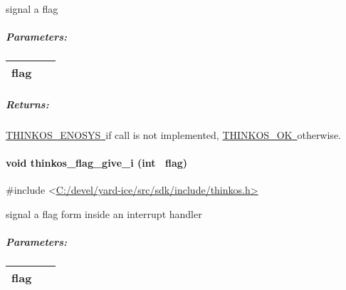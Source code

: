 {{signal a flag }

{}

\subparagraph{\texorpdfstring{{Parameters:}}{Parameters:}}\label{parameters-37}

\protect\hypertarget{t.383f7e723be615a1ab251cbb171dc44f8c48c9f4}{}{}\protect\hypertarget{t.37}{}{}

\begin{longtable}[]{@{}ll@{}}
\toprule
\begin{minipage}[t]{0.47\columnwidth}\raggedright\strut
{flag}{~}\strut
\end{minipage} & \begin{minipage}[t]{0.47\columnwidth}\raggedright\strut
{}\strut
\end{minipage}\tabularnewline
\bottomrule
\end{longtable}

\subparagraph{\texorpdfstring{{Returns:}}{Returns:}}\label{returns-41}

{\protect\hyperlink{h.3s49zyc}{THINKOS\_ENOSYS}}{\protect\hyperlink{h.3s49zyc}{~}}{if
call is not implemented,
}{\protect\hyperlink{h.2fk6b3p}{THINKOS\_OK}}{\protect\hyperlink{h.2fk6b3p}{~}}{otherwise.
}

\paragraph{\texorpdfstring{{void thinkos\_flag\_give\_i (int
~flag)}}{void thinkos\_flag\_give\_i (int ~flag)}}\label{void-thinkos_flag_give_i-int-flag}

{}

{\#include
\textless{}}{\protect\hyperlink{h.pkwqa1}{C:/devel/yard-ice/src/sdk/include/thinkos.h}}{\protect\hyperlink{h.pkwqa1}{\textgreater{}}}

{signal a flag form inside an interrupt handler }

{}

\subparagraph{\texorpdfstring{{Parameters:}}{Parameters:}}\label{parameters-38}

\protect\hypertarget{t.383f7e723be615a1ab251cbb171dc44f8c48c9f4}{}{}\protect\hypertarget{t.38}{}{}

\begin{longtable}[]{@{}ll@{}}
\toprule
\begin{minipage}[t]{0.47\columnwidth}\raggedright\strut
{flag}{~}\strut
\end{minipage} & \begin{minipage}[t]{0.47\columnwidth}\raggedright\strut
{}\strut
\end{minipage}\tabularnewline
\bottomrule
\end{longtable}

}
